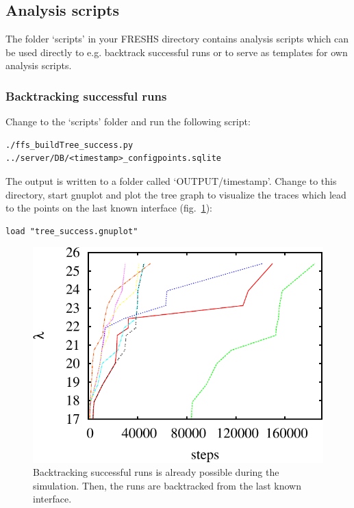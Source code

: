 \documentclass[a4paper,oneside]{article}
\newenvironment{mylisting}
{\begin{list}{}{\setlength{\leftmargin}{1em}}\item\scriptsize\bfseries}
{\end{list}}
\begin{document}
\subsection{Analysis scripts}
The folder `scripts' in your FRESHS directory contains analysis scripts which can be used directly to e.g. backtrack successful runs or to serve as templates for own analysis scripts.

\subsubsection{Backtracking successful runs}
Change to the `scripts' folder and run the following script:
\begin{mylisting}
\begin{verbatim}
./ffs_buildTree_success.py ../server/DB/<timestamp>_configpoints.sqlite
\end{verbatim}
\end{mylisting}
The output is written to a folder called `OUTPUT/timestamp'. Change to this directory, start gnuplot and plot the tree graph to visualize the traces which lead to the points on the last known interface (fig.~\ref{fig:traces}):
\begin{mylisting}
\begin{verbatim}
load "tree_success.gnuplot"
\end{verbatim}
\end{mylisting}

\begin{figure}
 \centering
 \includegraphics[width=0.5\linewidth]{pics/traces}
 \caption{Backtracking successful runs is already possible during the simulation. Then, the runs are backtracked from the last known interface.}
 \label{fig:traces}
\end{figure}
\end{document}
